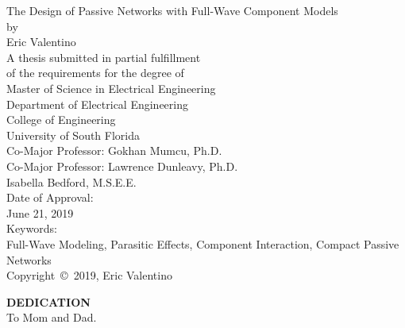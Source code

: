 \documentclass[12pt]{usfcoe}
\newcommand{\usfpagebreak}{\pagebreak\vspace*{0.5in}}
\begin{document}
\begin{titlepage}
	\fontsize{12}{14.4}
	\selectfont
	\singlespacing
	\begin{center}
		\vspace*{0.72in}
		The Design of Passive Networks with Full-Wave Component Models\\
		\vspace*{3\baselineskip}
		by\\
		\vspace*{3\baselineskip}
		Eric Valentino\\
		\vspace*{5\baselineskip}
		A thesis submitted in partial fulfillment\\ of the requirements for the degree of \\Master of Science in Electrical Engineering\\
		Department of Electrical Engineering\\
		College of Engineering\\
		University of South Florida\\
		\vspace*{3\baselineskip}
		Co-Major Professor: Gokhan Mumcu, Ph.D.\\
		Co-Major Professor: Lawrence Dunleavy, Ph.D.\\
		Isabella Bedford, M.S.E.E.\\
		\vspace*{2\baselineskip}
		Date of Approval:\\
		June 21, 2019\\
		\vspace*{3\baselineskip}
		Keywords:\\
		Full-Wave Modeling, Parasitic Effects, Component Interaction, Compact Passive Networks \\
		\vspace*{\baselineskip}
		Copyright~\copyright~2019, Eric Valentino
	\end{center}
\end{titlepage}
		
	

\usfpagebreak
\thispagestyle{empty}
\begin{center}
\textbf{DEDICATION}\\
\normalfont 
To Mom and Dad. 
\end{center}
	
\end{document}
